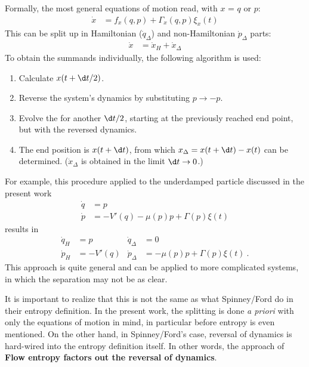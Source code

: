 Formally, the most general equations of motion read, with \(x\) = \(q\) or \(p\):
%
\begin{align}
	\dot x &= f_x(q,p) + \Gamma_x(q,p)\xi_x(t)
\end{align}
%
This can be split up in Hamiltonian (\(\dot q_\Delta\)) and non-Hamiltonian \(\dot p_\Delta\) parts:
%
\begin{align}
	\dot x &= \dot x_H + \dot x_\Delta
\end{align}
%
To obtain the summands individually, the following algorithm is used:
%
\begin{enumerate}
	\item Calculate \(x(t+\d t/2) \).
	\item Reverse the system's dynamics by substituting \(p \to -p\).
	\item Evolve the for another \(\d t/2\), starting at the previously reached end point, but with the reversed dynamics.
	\item The end position is \(x(t+\d t)\), from which \(x_\Delta = x(t+\d t) - x(t)\) can be determined. (\(\dot x_\Delta\) is obtained in the limit \(\d t \to 0\).)
\end{enumerate}
%
For example, this procedure applied to the underdamped particle discussed in the present work
%
\begin{align*}
	\dot q &= p \\
	\dot p &= -V'(q) - \mu(p)p + \Gamma(p)\xi(t)
\end{align*}
results in
\begin{align*}
	\dot q_H &= p  &  \dot q_\Delta &= 0 \\
	\dot p_H &= -V'(q)  &  \dot p_\Delta &= - \mu(p)p + \Gamma(p)\xi(t) ~.
\end{align*}
This approach is quite general and can be applied to more complicated systems, in which the separation may not be as clear.

It is important to realize that this is not the same as what Spinney/Ford do in their entropy definition. In the present work, the splitting is done \emph{a priori} with only the equations of motion in mind, in particular before entropy is even mentioned. On the other hand, in Spinney/Ford's case, reversal of dynamics is hard-wired into the entropy definition itself. In other words, the approach of \textbf{Flow entropy factors out the reversal of dynamics}.

